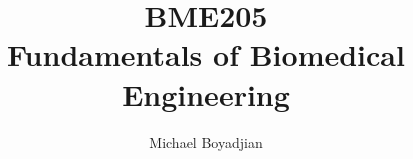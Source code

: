 \documentclass[11pt]{article}
\begin{document}
\title{BME205 \\ Fundamentals of Biomedical Engineering}
\author{Michael Boyadjian}
\maketitle
\pagebreak

\tableofcontents

\pagebreak

\bigskip
\bigskip
\bigskip
\end{document}
